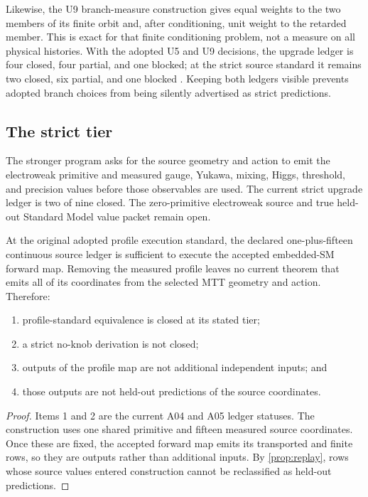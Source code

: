 \documentclass[11pt]{article}
\begin{document}
Likewise, the U9 branch-measure construction gives equal weights to the two
members of its finite orbit and, after conditioning, unit weight to the
retarded member. This is exact for that finite conditioning problem, not a
measure on all physical histories. With the adopted U5 and U9 decisions, the
upgrade ledger is four closed, four partial, and one blocked; at the strict
source standard it remains two closed, six partial, and one blocked
\cite{FrozenU9}. Keeping both ledgers visible prevents adopted branch choices
from being silently advertised as strict predictions.

\subsection{The strict tier}

The stronger program asks for the source geometry and action to emit the
electroweak primitive and measured gauge, Yukawa, mixing, Higgs, threshold,
and precision values before those observables are used. The current strict
upgrade ledger is two of nine closed. The zero-primitive electroweak source
and true held-out Standard Model value packet remain open.

\begin{theorem}
\label{thm:current-ledger}
At the original adopted profile execution standard, the declared
one-plus-fifteen continuous
source ledger is sufficient to execute the accepted embedded-SM forward map.
Removing the measured profile leaves no current theorem that emits all of its
coordinates from the selected MTT geometry and action. Therefore:
\begin{enumerate}
\item profile-standard equivalence is closed at its stated tier;
\item a strict no-knob derivation is not closed;
\item outputs of the profile map are not additional independent inputs; and
\item those outputs are not held-out predictions of the source coordinates.
\end{enumerate}
\end{theorem}

\begin{proof}
Items 1 and 2 are the current A04 and A05 ledger statuses. The construction
uses one shared primitive and fifteen measured source coordinates. Once these
are fixed, the accepted forward map emits its transported and finite rows, so
they are outputs rather than additional inputs. By \cref{prop:replay}, rows
whose source values entered construction cannot be reclassified as held-out
predictions.
\end{proof}
\end{document}
